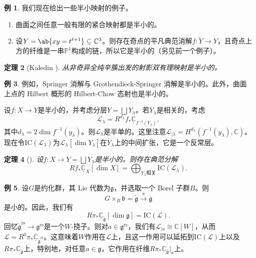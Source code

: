 \documentclass{amsart}
\newtheorem{thm}{定理}[section]
\theoremstyle{definition}
\newtheorem{exm}[thm]{例}
\newtheorem{exms}[thm]{例}
\theoremstyle{remark}
\theoremstyle{plain}
\theoremstyle{definition}
\theoremstyle{remark}
\newcommand{\C}{\mathbb{C}}
\renewcommand{\P}{\mathbb{P}}
\newcommand{\g}{\mathfrak{g}}
\renewcommand{\b}{\mathfrak{b}}
\newcommand{\mc}[1]{\mathcal{#1}}
\newcommand{\mr}[1]{\mathrm{#1}}
\newcommand{\on}[1]{\operatorname{#1}}
\newcommand{\ol}[1]{\overline{#1}}
\newcommand{\ul}[1]{\underline{#1}}
\newcommand{\1}{\mathbf{1}}
\newcommand{\2}{\mathbf{2}}
\newcommand{\3}{\mathbf{3}}
\begin{document}
\begin{exms}
    我们现在给出一些半小映射的例子。
    \begin{enumerate}
        \item 曲面之间任意一般有限的紧合映射都是半小的。
        \item 设\(Y = \ab\{xy = t^{\ell+1}\} \subseteq \C^3\)。则存在奇点的平凡典范消解\(f \colon \tilde{Y} \to Y\)，且奇点上方的纤维是一串\(\P^1\)构成的链，所以它是半小的（另见前一个例子）。
    \end{enumerate}
\end{exms}

\begin{thm}[Kaledin {\cite{Kaledin2006}}]
    从非奇异全纯辛簇出发的射影双有理映射是半小的。
\end{thm}

\begin{exm}
    例如，Springer 消解与 Grothendieck-Springer 消解是半小的。此外，曲面上点的 Hilbert 概形的 Hilbert-Chow 态射也是半小的。
\end{exm}

设\(f \colon X \to Y\)是半小的，并考虑分层\(Y = \bigsqcup Y_{\lambda}\)。若\(Y_{\lambda}\)是相关的，考虑
\[ \mc{L}_{\lambda} = R^{d_{\lambda}} f_* \ul{\C}_{f^{-1}(Y_{\lambda})}, \]
其中\(d_{\lambda} = 2 \dim f^{-1} (y_{\lambda})\)。则\(\mc{L}_{\lambda}\)是半单的。这里注意\(\mc{L}_{|\lambda} = H^{d_{\lambda}}(f^{-1}(y_{\lambda}), \C)\)。现在令\(\mr{IC}(\mc{L}_{\lambda})\)为\(\mc{L}_{\lambda}[\dim Y_{\lambda}]\)在\(\ol{Y}_{\lambda}\)上的中间扩张，它是一个反常层。

\begin{thm}[{\cite{DeCataldoMigliorini2002}}]
    设\(f \colon X \to Y = \bigsqcup Y_{\lambda}\)是半小的。则存在典范分解
    \[ R f_* \ul{\C}_X[\dim X] = \bigoplus_{Y_{\lambda}\text{相关}} \mr{IC}(\mc{L}_{\lambda}). \]
\end{thm}

\begin{exm}
    设\(G\)是约化群，其 Lie 代数为\(\g\)，并选取一个 Borel 子群\(B\)。则
    \[ G \times_B \b = \tilde{\g} \xrightarrow{\pi} \g \]
    是小的。因此，我们有
    \[ R \pi_* \ul{\C}_{\tilde{\g}} [\dim \g] = \mr{IC}(\mc{L}). \]
    回忆\(\tilde{\g}^{\on{rs}} \to \g^{\on{rs}}\)是一个\(W\)-挠子。则对\(a \in \g^{\on{rs}}\)，我们有\(\mc{L}_{|a} \cong \C[W]\)，从而\(\mc{L} = R^0 \pi_* \ul{\C}_{\tilde{\g}^{\on{rs}}}\)。这意味着\(W\)作用在\(\mc{L}\)上，且这一作用可以延拓到\(\mr{IC}(\mc{L})\)上以及\(R \pi_* \C_{\tilde{\g}}\)上，特别地，对任意\(a \in \g\)，它作用在纤维\(R \pi_* \C_{\tilde{\g}}|_a\)上。
\end{exm}
\end{document}
